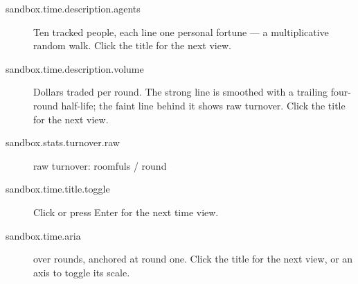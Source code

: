\begin{description}
  \item[sandbox.time.description.agents] Ten tracked people, each line one personal fortune — a multiplicative random walk. Click the title for the next view.
  \item[sandbox.time.description.volume] Dollars traded per round. The strong line is smoothed with a trailing four-round half-life; the faint line behind it shows raw turnover. Click the title for the next view.
  \item[sandbox.stats.turnover.raw] raw turnover:  roomfuls / round
  \item[sandbox.time.title.toggle] Click or press Enter for the next time view.
  \item[sandbox.time.aria]  over  rounds, anchored at round one. Click the title for the next view, or an axis to toggle its scale.
\end{description}
